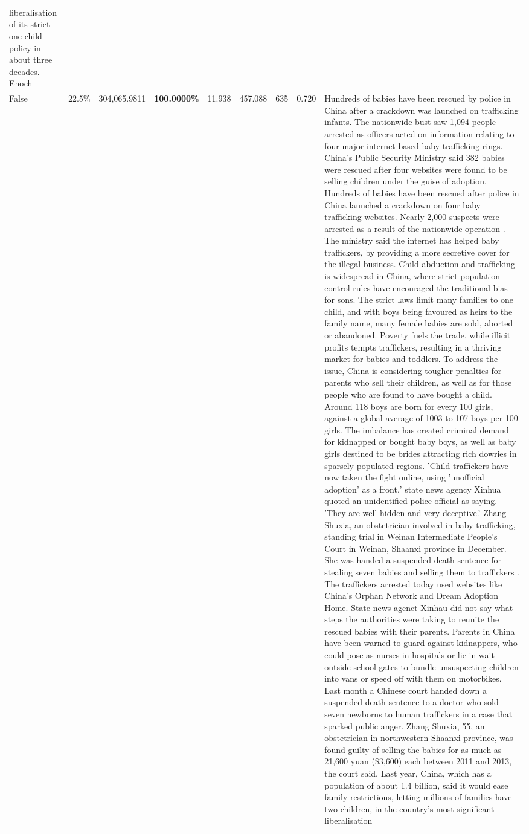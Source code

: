 \begin{table}[H]
\begin{tabular}{lllrlllll}
liberalisation of its strict one-child policy in about three decades. Enoch \\
\cline{1-9}
False & 22.5\% & 304,065.9811 & \bfseries \color{red} 100.0000\% & 11.938 & 457.088 & 635 & 0.720 & Hundreds of babies have been rescued by police in China after a crackdown was launched on trafficking infants. The nationwide bust saw 1,094 people arrested as officers acted on information relating to four major internet-based baby trafficking rings. China's Public Security Ministry said 382 babies were rescued after four websites were found to be selling children under the guise of adoption. Hundreds of babies have been rescued after police in China launched a crackdown on four baby trafficking websites. Nearly 2,000 suspects were arrested as a result of the nationwide operation . The ministry said the internet has helped baby traffickers, by providing a more secretive cover for the illegal business. Child abduction and trafficking is widespread in China, where strict population control rules have encouraged the traditional bias for sons. The strict laws limit many families to one child, and with boys being favoured as heirs to the family name, many female babies are sold, aborted or abandoned. Poverty fuels the trade, while illicit profits tempts traffickers, resulting in a thriving market for babies and toddlers. To address the issue, China is considering tougher penalties for parents who sell their children, as well as for those people who are found to have bought a child. Around 118 boys are born for every 100 girls, against a global average of 1003 to 107 boys per 100 girls. The imbalance has created criminal demand for kidnapped or bought baby boys, as well as baby girls destined to be brides attracting rich dowries in sparsely populated regions. 'Child traffickers have now taken the fight online, using 'unofficial adoption' as a front,' state news agency Xinhua quoted an unidentified police official as saying. 'They are well-hidden and very deceptive.' Zhang Shuxia, an obstetrician involved in baby trafficking, standing trial in Weinan Intermediate People's Court in Weinan, Shaanxi province in December. She was handed a suspended death sentence for stealing seven babies and selling them to traffickers . The traffickers arrested today used websites like China's Orphan Network and Dream Adoption Home. State news agenct Xinhau did not say what steps the authorities were taking to reunite the rescued babies with their parents. Parents in China have been warned to guard against kidnappers, who could pose as nurses in hospitals or lie in wait outside school gates to bundle unsuspecting children into vans or speed off with them on motorbikes. Last month a Chinese court handed down a suspended death sentence to a doctor who sold seven newborns to human traffickers in a case that sparked public anger. Zhang Shuxia, 55, an obstetrician in northwestern Shaanxi province, was found guilty of selling the babies for as much as 21,600 yuan (\$3,600) each between 2011 and 2013, the court said. Last year, China, which has a population of about 1.4 billion, said it would ease family restrictions, letting millions of families have two children, in the country's most significant liberalisation 
\end{tabular}
\end{table}
